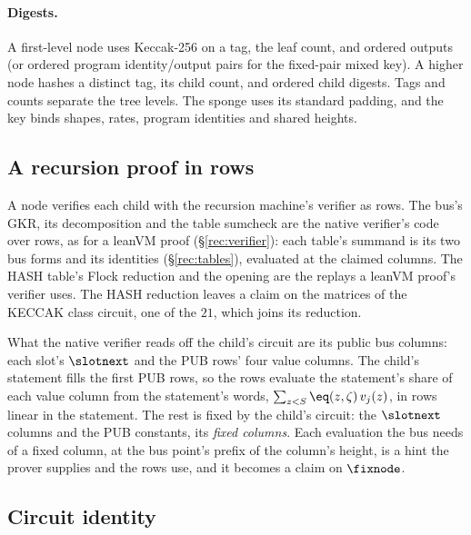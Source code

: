 \paragraph{Digests.} A first-level node uses Keccak-256 on a tag, the leaf count, and ordered outputs (or ordered program identity/output pairs for the fixed-pair mixed key). A higher node hashes a distinct tag, its child count, and ordered child digests. Tags and counts separate the tree levels. The sponge uses its standard padding, and the key binds shapes, rates, program identities and shared heights.

\subsection{A recursion proof in rows}\label{rec:child}

A node verifies each child with the recursion machine's verifier as rows. The bus's GKR, its decomposition and the table sumcheck are the native verifier's code over rows, as for a leanVM proof (\S\ref{rec:verifier}): each table's summand is its two bus forms and its identities (\S\ref{rec:tables}), evaluated at the claimed columns. The \textsf{HASH} table's Flock reduction and the opening are the replays a leanVM proof's verifier uses. The \textsf{HASH} reduction leaves a claim on the matrices of the \textsf{KECCAK} class circuit, one of the $21$, which joins its reduction.

What the native verifier reads off the child's circuit are its public bus columns: each slot's $\slotnext$ and the \textsf{PUB} rows' four value columns. The child's statement fills the first \textsf{PUB} rows, so the rows evaluate the statement's share of each value column from the statement's words, $\sum_{z<S}\eq(z,\zeta)\,v_j(z)$, in rows linear in the statement. The rest is fixed by the child's circuit: the $\slotnext$ columns and the \textsf{PUB} constants, its \emph{fixed columns}. Each evaluation the bus needs of a fixed column, at the bus point's prefix of the column's height, is a hint the prover supplies and the rows use, and it becomes a claim on $\fixnode$.

\subsection{Circuit identity}\label{rec:identity}

